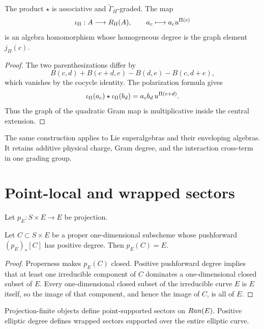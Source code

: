 \begin{theorem}
The product $\star$ is associative and $\widetilde\Gamma_\Pi$-graded. The map
\[
 \iota_\Pi:A\longrightarrow R_\Pi(A),
 \qquad a_c\longmapsto a_cu^{\Pi(c)}
\]
is an algebra homomorphism whose homogeneous degree is the graph element $j_\Pi(c)$.
\end{theorem}
\begin{proof}
The two parenthesizations differ by
\[
 B(c,d)+B(c+d,e)-B(d,e)-B(c,d+e),
\]
which vanishes by the cocycle identity. The polarization formula gives
\[
 \iota_\Pi(a_c)\star\iota_\Pi(b_d)
 =a_cb_d\,u^{\Pi(c+d)}.
\]
Thus the graph of the quadratic Gram map is multiplicative inside the central extension.
\end{proof}

The same construction applies to Lie superalgebras and their enveloping algebras. It retains additive physical charge, Gram degree, and the interaction cross-term in one grading group.

\chapter{Point-local and wrapped sectors}
Let $p_E:S\times E\to E$ be projection.

\begin{lemma}
Let $C\subset S\times E$ be a proper one-dimensional subscheme whose pushforward $(p_E)_*[C]$ has positive degree. Then $p_E(C)=E$.
\end{lemma}
\begin{proof}
Properness makes $p_E(C)$ closed. Positive pushforward degree implies that at least one irreducible component of $C$ dominates a one-dimensional closed subset of $E$. Every one-dimensional closed subset of the irreducible curve $E$ is $E$ itself, so the image of that component, and hence the image of $C$, is all of $E$.
\end{proof}

Projection-finite objects define point-supported sectors on $Ran(E)$. Positive elliptic degree defines wrapped sectors supported over the entire elliptic curve.

